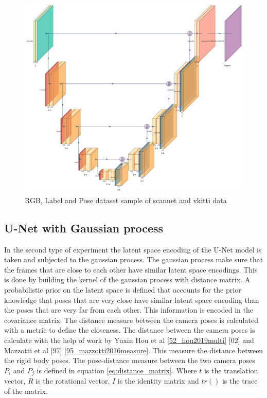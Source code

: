 	\begin{figure}[h]
		\centering
		\includegraphics[width=14cm]{images/Unet.jpg}
		\caption{RGB, Label and Pose dataset sample of scannet and vkitti data}
		\label{fig:unet_model}
	\end{figure}
	
    \subsection{U-Net with Gaussian process}
    
    In the second type of experiment the latent space encoding of the U-Net model is taken and subjected to the gaussian process. The gaussian process make sure that the frames that are close to each other have similar latent space encodings. This is done by building the kernel of the gaussian process with distance matrix. A probabilistic prior on the latent space is defined that accounts for the prior knowledge that poses that are very close have similar latent space encoding than the poses that are very far from each other. This information is encoded in the covariance matrix. The distance measure between the camera poses is calculated with a metric to define the closeness. The distance between the camera poses is calculate with the help of work by Yuxin Hou et al \ref{52_hou2019multi} [02] and Mazzotti et al [97] \ref{95_mazzotti2016measure}. This measure the distance between the rigid body poses. The pose-distance measure between the two camera poses $P_i$ and $P_j$ is defined in equation \ref{eq:distance_matrix}. Where $t$ is the translation vector, $R$ is the rotational vector, $I$ is the identity matrix and $tr()$ is the trace of the matrix.  
    
